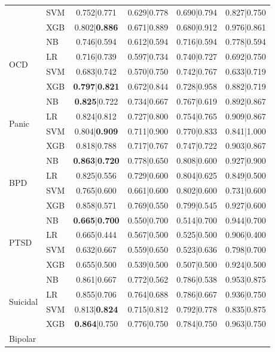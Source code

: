 \documentclass[11pt]{article}
\begin{document}
\begin{table}[t]
{\begin{tabular}{llcccc}
 & SVM & 0.752|0.771 & 0.629|0.778 & 0.690|0.794 & 0.827|0.750 \\
 & XGB & 0.802|\textbf{0.886} & 0.671|0.889 & 0.680|0.912 & 0.976|0.861 \\
\midrule
\multirow{4}{*}{OCD}
 & NB & 0.746|0.594 & 0.612|0.594 & 0.716|0.594 & 0.778|0.594 \\
 & LR & 0.716|0.739 & 0.597|0.734 & 0.740|0.727 & 0.692|0.750 \\
 & SVM & 0.683|0.742 & 0.570|0.750 & 0.742|0.767 & 0.633|0.719 \\
 & XGB & \textbf{0.797}|\textbf{0.821} & 0.672|0.844 & 0.728|0.958 & 0.882|0.719 \\
\midrule
\multirow{4}{*}{Panic}
 & NB & \textbf{0.825}|0.722 & 0.734|0.667 & 0.767|0.619 & 0.892|0.867 \\
 & LR & 0.824|0.812 & 0.727|0.800 & 0.754|0.765 & 0.909|0.867 \\
 & SVM & 0.804|\textbf{0.909} & 0.711|0.900 & 0.770|0.833 & 0.841|1.000 \\
 & XGB & 0.818|0.788 & 0.717|0.767 & 0.747|0.722 & 0.903|0.867 \\
\midrule
\multirow{4}{*}{BPD}
 & NB & \textbf{0.863}|\textbf{0.720} & 0.778|0.650 & 0.808|0.600 & 0.927|0.900 \\
 & LR & 0.825|0.556 & 0.729|0.600 & 0.804|0.625 & 0.849|0.500 \\
 & SVM & 0.765|0.600 & 0.661|0.600 & 0.802|0.600 & 0.731|0.600 \\
 & XGB & 0.858|0.571 & 0.769|0.550 & 0.799|0.545 & 0.927|0.600 \\
\midrule
\multirow{4}{*}{PTSD}
 & NB & \textbf{0.665}|\textbf{0.700} & 0.550|0.700 & 0.514|0.700 & 0.944|0.700 \\
 & LR & 0.665|0.444 & 0.567|0.500 & 0.525|0.500 & 0.906|0.400 \\
 & SVM & 0.632|0.667 & 0.559|0.650 & 0.523|0.636 & 0.798|0.700 \\
 & XGB & 0.655|0.500 & 0.539|0.500 & 0.507|0.500 & 0.924|0.500 \\
\midrule
\multirow{4}{*}{Suicidal}
 & NB & 0.861|0.667 & 0.772|0.562 & 0.786|0.538 & 0.953|0.875 \\
 & LR & 0.855|0.706 & 0.764|0.688 & 0.786|0.667 & 0.936|0.750 \\
 & SVM & 0.813|\textbf{0.824} & 0.715|0.812 & 0.792|0.778 & 0.835|0.875 \\
 & XGB & \textbf{0.864}|0.750 & 0.776|0.750 & 0.784|0.750 & 0.963|0.750 \\
\midrule
\multirow{4}{*}{Bipolar}

\end{tabular}}
\end{table}
\end{document}
